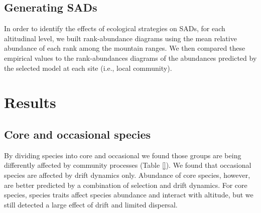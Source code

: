 \documentclass[12pt]{article}
\begin{document}
\subsection*{Generating SADs}

In order to identify the effects of ecological strategies on SADs, for each altitudinal level, we built rank-abundance diagrams using the mean relative abundance of each rank among the mountain ranges. We then compared these empirical
values to the rank-abundances diagrams of the abundances predicted by the selected model at each site (i.e., local community). 

\section*{Results}

\subsection*{Core and occasional species}

By dividing species into core and occasional we found those groups are being differently affected by community processes (Table \ref{}). We found that occasional species are affected by drift dynamics only. Abundance of core species, however, are better predicted by a combination of selection and drift dynamics. For core species, species traits affect species abundance and interact with altitude, but
we still detected a large effect of drift and limited dispersal.

\end{document}
